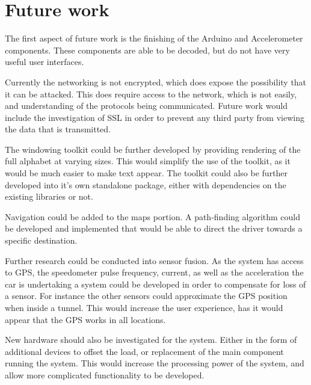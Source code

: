 \section{Future work}

The first aspect of future work is the finishing of the Arduino and Accelerometer components. These components are able to be decoded, but do not have very useful user interfaces. 

Currently the networking is not encrypted, which does expose the possibility that it can be attacked. This does require access to the network, which is not easily, and understanding of the protocols being communicated. Future work would include the investigation of SSL in order to prevent any third party from viewing the data that is transmitted.

The windowing toolkit could be further developed by providing rendering of the full alphabet at varying sizes. This would simplify the use of the toolkit, as it would be much easier to make text appear. The toolkit could also be further developed into it's own standalone package, either with dependencies on the existing libraries or not.

Navigation could be added to the maps portion. A path-finding algorithm could be developed and implemented that would be able to direct the driver towards a specific destination.

Further research could be conducted into sensor fusion. As the system has access to GPS, the speedometer pulse frequency, current, as well as the acceleration the car is undertaking a system could be developed in order to compensate for loss of a sensor. For instance the other sensors could approximate the GPS position when inside a tunnel. This would increase the user experience, has it would appear that the GPS works in all locations.

New hardware should also be investigated for the system. Either in the form of additional devices to offset the load, or replacement of the main component running the system. This would increase the processing power of the system, and allow more complicated functionality to be developed.





 






